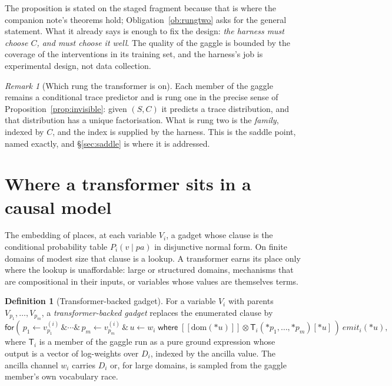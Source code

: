 \documentclass[11pt]{article}
\theoremstyle{plain}
\theoremstyle{definition}
\newtheorem{definition}[theorem]{Definition}
\theoremstyle{remark}
\newtheorem{remark}[theorem]{Remark}
\newcommand{\crisp}[1]{[\![#1]\!]}
\newcommand{\tensorv}{\otimes}
\newcommand{\fork}{\textsf{for}}
\newcommand{\where}{\textsf{where}}
\begin{document}
The proposition is stated on the staged fragment because that is where the
companion note's theorems hold; Obligation~\ref{ob:rungtwo} asks for the
general statement. What it already says is enough to fix the design: \emph{the
harness must choose $C$, and must choose it well}. The quality of the gaggle is
bounded by the coverage of the interventions in its training set, and the
harness's job is experimental design, not data collection.

\begin{remark}[Which rung the transformer is on]
Each member of the gaggle remains a conditional trace predictor and is rung one
in the precise sense of Proposition~\ref{prop:invisible}: given $(S, C)$ it
predicts a trace distribution, and that distribution has a unique
factorisation. What is rung two is the \emph{family}, indexed by $C$, and the
index is supplied by the harness. This is the saddle point, named exactly, and
\S\ref{sec:saddle} is where it is addressed.
\end{remark}

\section{Where a transformer sits in a causal model}\label{sec:mechanism}

The embedding of \cite{Interventions} places, at each variable $V_i$, a gadget
whose clause is the conditional probability table $P_i(v \mid \mathit{pa})$ in
disjunctive normal form. On finite domains of modest size that clause is a
lookup. A transformer earns its place only where the lookup is unaffordable:
large or structured domains, mechanisms that are compositional in their inputs,
or variables whose values are themselves terms.

\begin{definition}[Transformer-backed gadget]\label{def:tgadget}
For a variable $V_i$ with parents $V_{p_1}, \dots, V_{p_m}$, a
\emph{transformer-backed gadget} replaces the enumerated clause by
\[
\fork(\,p_1 \leftarrow v^{(i)}_{p_1} \,\&\cdots\&\, p_m \leftarrow v^{(i)}_{p_m}
\,\&\, u \leftarrow w_i \;\where\; \crisp{\mathrm{dom}(*u)} \tensorv
\mathsf{T}_i(*p_1, \dots, *p_m)[*u]\,)\ \mathit{emit}_i(*u),
\]
where $\mathsf{T}_i$ is a member of the gaggle run as a pure ground expression
whose output is a vector of log-weights over $D_i$, indexed by the ancilla
value. The ancilla channel $w_i$ carries $D_i$ or, for large domains, is
sampled from the gaggle member's own vocabulary race.
\end{definition}
\end{document}
